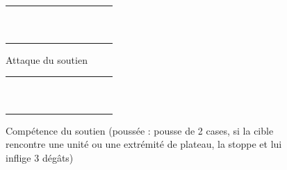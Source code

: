 \documentclass[a4paper]{scrreprt}
\begin{document}
\begin{figure}
    \centering
    \begin{tabular}{|c|c|c|c|c|c|c|c|c|c|c|}
        \hline
        &&&&&&&&&&\\ \hline  
        &&&&&&&&&&\\ \hline 
        &&&&&\cellcolor{cred}&&&&&\\ \hline
        &&&&&\cellcolor{cred}&&&&&\\ \hline
        &&&&&\cellcolor{cred}&&&&&\\ \hline
        &&\cellcolor{cred}&\cellcolor{cred}&\cellcolor{cred}&\cellcolor{yellow}&\cellcolor{cred}&\cellcolor{cred}&\cellcolor{cred}&&\\ \hline
        &&&&&\cellcolor{cred}&&&&&\\ \hline
        &&&&&\cellcolor{cred}&&&&&\\ \hline
        &&&&&\cellcolor{cred}&&&&&\\ \hline
        &&&&&&&&&&\\ \hline
        &&&&&&&&&&\\ \hline
        
    \end{tabular}
    \caption{Attaque du soutien}
    \label{fig:soutienatt}
\end{figure}

\begin{figure}
    \centering
    \begin{tabular}{|c|c|c|c|c|c|c|c|c|c|c|}
        \hline
        &&&&&&&&&&\\ \hline  
        &&&&&&&&&&\\ \hline 
        &&&&&&&&&&\\ \hline
        &&&&&\cellcolor{cgreen}&&&&&\\ \hline
        &&&&&&&&&&\\ \hline
        &&&\cellcolor{cgreen}&&\cellcolor{yellow}&&\cellcolor{cgreen}&&&\\ \hline
        &&&&&&&&&&\\ \hline
        &&&&&\cellcolor{cgreen}&&&&&\\ \hline
        &&&&&&&&&&\\ \hline
        &&&&&&&&&&\\ \hline
        &&&&&&&&&&\\ \hline
        
    \end{tabular}
    \caption{Compétence du soutien (poussée : pousse de 2 cases, si la cible rencontre une unité ou une extrémité de plateau, la stoppe et lui inflige 3 dégâts)}
    \label{fig:soutiencomp}
\end{figure}
\end{document}

